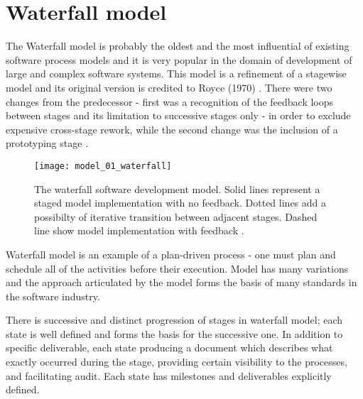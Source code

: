 \section{Waterfall model}
The Waterfall model is probably the oldest and the most influential of existing software 
process models and it is very popular in the domain of development of large and 
complex software systems. 
This model is a refinement of a stagewise model and its 
original version is credited to Royce (1970) \cite{citeulike:9982731}. There were two 
changes from the predecessor - first was a recognition of the feedback loops between 
stages and its limitation to successive stages only - in order to exclude expensive
cross-stage rework, while the second change was the inclusion of a prototyping stage
\cite{Boehm95anchoringthe}.

\begin{figure}[tbp]
   \centering
   \texttt{[image: model\_01\_waterfall]}
   \caption{The waterfall software development model. Solid lines represent a staged 
      model implementation with no feedback. Dotted lines add a possibilty of 
      iterative transition between adjacent stages. Dashed line show model 
      implementation with feedback \cite{citeulike:9982731}. }
   \label{fig:model_waterfall}
\end{figure}

Waterfall model is an example of a plan-driven process - one must plan and schedule all 
of the activities before their execution. Model has many variations and the approach 
articulated by the model forms the basis of many standards in the software industry.

There is successive and distinct progression of stages in waterfall model; each state 
is well defined and forms the basis for the successive one. In addition to specific 
deliverable, each state producing a document which describes what exactly occurred 
during the stage, providing certain visibility to the processes, and facilitating 
audit. Each state has milestones and deliverables explicitly defined.

